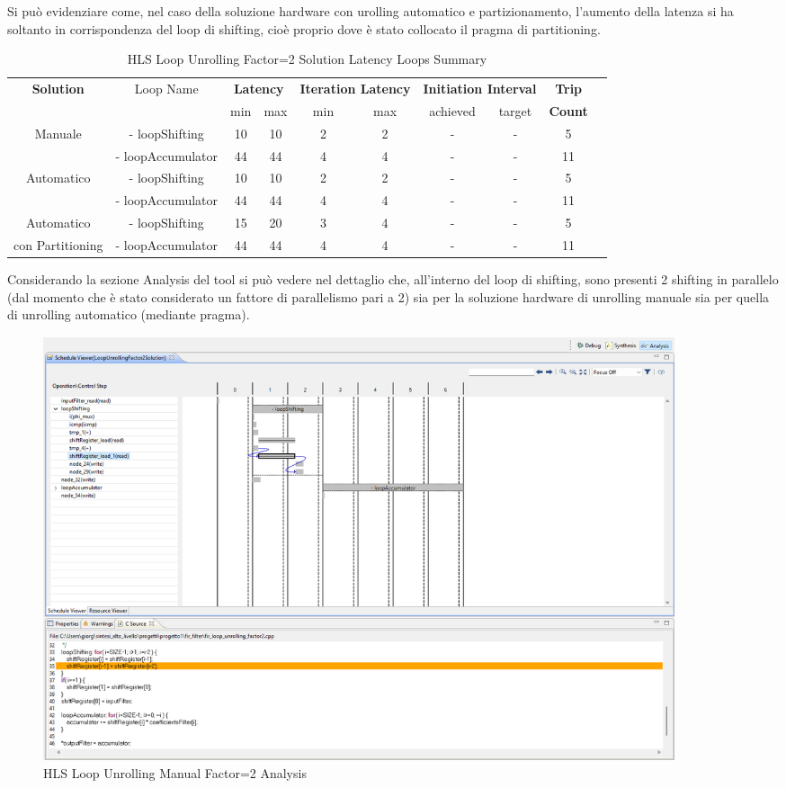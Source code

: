 Si può evidenziare come, nel caso della soluzione hardware con urolling automatico e partizionamento, l'aumento della latenza si ha soltanto in corrispondenza del loop di shifting, cioè proprio dove è stato collocato il pragma di partitioning.

\begin{table}[H]
    \centering
    \begin{tabular}{|c|c|c|c|c|c|c|c|c|c|}
        \hline
        \multicolumn{1}{|c|}{\textbf{Solution}} & \multicolumn{1}{|c|}{Loop Name} & \multicolumn{2}{|c|}{\textbf{Latency}} & \multicolumn{2}{c|}{\textbf{Iteration Latency}} & \multicolumn{2}{c|}{\textbf{Initiation Interval}} & \multicolumn{1}{c|}{\textbf{Trip}}  \\
        &  & min & max & min & max & achieved & target & \textbf{Count} \\
        \hline
        Manuale & - loopShifting & 10 & 10 & 2 & 2 & - & - & 5 \\
        & - loopAccumulator & 44 & 44 & 4 & 4 & - & - & 11 \\
        \hline
        Automatico & - loopShifting & 10 & 10 & 2 & 2 & - & - & 5 \\
        & - loopAccumulator & 44 & 44 & 4 & 4 & - & - & 11 \\
        \hline
        Automatico  & - loopShifting & 15 & 20 & 3 & 4 & - & - & 5 \\
        con Partitioning & - loopAccumulator & 44 & 44 & 4 & 4 & - & - & 11 \\
        \hline
    \end{tabular}
    \caption{HLS Loop Unrolling Factor=2 Solution Latency Loops Summary }
    \label{tab:hls-loop-unrolling-factor2-solution-loop-summary}
\end{table}

Considerando la sezione Analysis del tool si può vedere nel dettaglio che, all'interno del loop di shifting, sono presenti 2 shifting in parallelo (dal momento che è stato considerato un fattore di parallelismo pari a 2) sia per la soluzione hardware di unrolling manuale sia per quella di unrolling automatico (mediante pragma).

\begin{figure}[H]
    \centering
    \includegraphics[width=0.9\textwidth]{solutions/loop_unrolling/factor2/loopunrollingmanual2.png}
    \caption{HLS Loop Unrolling Manual Factor=2 Analysis}
\end{figure}

